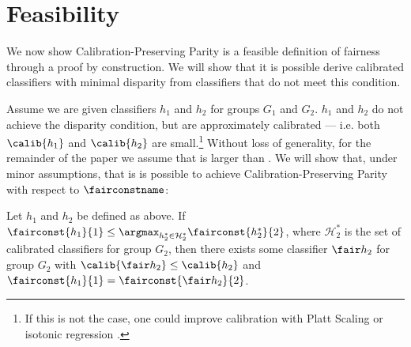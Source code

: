 \section{Feasibility}
\label{sec:feasibility}

We now show Calibration-Preserving Parity is a feasible definition
of fairness through a proof by construction. We will show that it is possible
derive calibrated classifiers with minimal disparity from classifiers that do
not meet this condition.

Assume we are given classifiers $h_1$ and $h_2$ for groups $G_1$ and $G_2$.
$h_1$ and $h_2$ do not achieve the disparity condition, but are approximately
calibrated --- i.e.  both $\calib{h_1}$ and $\calib{h_2}$ are small.\footnote{
  If this is not the case, one could improve calibration
  with Platt Scaling \cite{platt1999probabilistic} or
  isotonic regression \cite{zadrozny2001obtaining}.
}
Without loss of generality, for the remainder of the paper we assume that
 is larger than .
We will show that, under minor assumptions, that is is possible to achieve
Calibration-Preserving Parity with respect to $\fairconstname$:
%
\begin{thm}[Feasibility]
  Let $h_1$ and $h_2$ be defined as above. If $\fairconst{h_1}{1} \leq
  \argmax_{h^*_2 \in \mathcal{H}^*_2} \fairconst{h^*_2}{2}$, where
  $\mathcal{H}^*_2$ is the set of calibrated classifiers for group $G_2$,
  then there exists some classifier $\fair h_2$ for group $G_2$ with
  $\calib{\fair h_2} \leq \calib{h_2}$ and $\fairconst{h_1}{1} = \fairconst{\fair h_2}{2}$.
  \label{thm:feasibility}
\end{thm}

